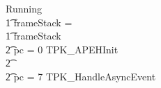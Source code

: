 \begin{figure}[p!]
  \setlength{\zedindent}{0cm}
  \setlength{\zedtab}{0.3cm}
  \setlength{\zedleftsep}{0.1cm}
  \begin{circus}
    Running \circdef \\
    \t1 \circif frameStack = \emptyset \circthen \Skip \\
    \t1 {} \circelse frameStack \neq \emptyset \circthen {} \\
    \t2 {} \circif pc = 0 \circthen TPK\_APEHInit \\
    \t2 {} \cdots {} \\
    \t2 {} \circelse pc = 7 \circthen TPK\_HandleAsyncEvent \\

\end{circus}
\end{figure}
